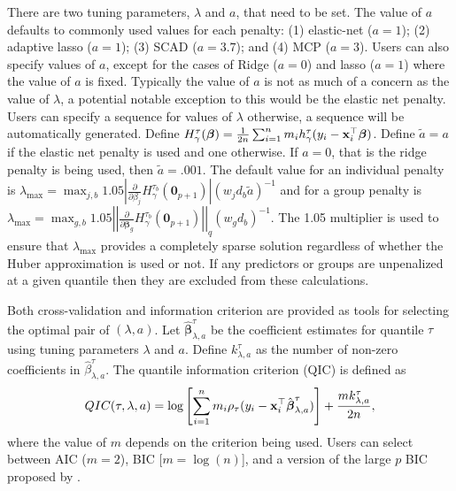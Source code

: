 There are two tuning parameters, \(\lambda\) and \(a\), that need to be set. The value of \(a\) defaults to commonly used values for each penalty: (1) elastic-net (\(a=1\)); (2) adaptive lasso (\(a=1\)); (3) SCAD (\(a=3.7\)); and (4) MCP (\(a=3\)). Users can also specify values of \(a\), except for the cases of Ridge (\(a=0\)) and lasso (\(a=1\)) where the value of \(a\) is fixed. Typically the value of \(a\) is not as much of a concern as the value of \(\lambda\), a potential notable exception to this would be the elastic net penalty. Users can specify a sequence for values of \(\lambda\) otherwise, a sequence will be automatically generated. Define \(H_\gamma^\tau(\boldsymbol \beta) = \frac{1}{2n} \sum_{i=1}^n m_i h_\gamma^\tau(y_i - {\bf x}_i^\top\boldsymbol \beta)\). Define \(\tilde{a}=a\) if the elastic net penalty is used and one otherwise. If \(a=0\), that is the ridge penalty is being used, then \(\tilde{a}=.001\). The default value for an individual penalty is \(\lambda_{\max} = \max_{j,b} 1.05\left|\frac{\partial}{\partial \beta_j} H_\gamma^{\tau_b}(\mathbf{0}_{p+1})\right|(w_jd_b\tilde{a})^{-1}\) and for a group penalty is \(\lambda_{\max} = \max_{g,b} 1.05\left|\left| \frac{\partial}{\partial \boldsymbol \beta_g} H_\gamma^{\tau_b}(\mathbf{0}_{p+1})\right|\right|_q (w_gd_b)^{-1}\). The 1.05 multiplier is used to ensure that \(\lambda_{\max}\) provides a completely sparse solution regardless of whether the Huber approximation is used or not. If any predictors or groups are unpenalized at a given quantile then they are excluded from these calculations.

Both cross-validation and information criterion are provided as tools for selecting the optimal pair of \((\lambda,a)\). Let \(\hat{\boldsymbol \beta}^\tau_{\lambda,a}\) be the coefficient estimates for quantile \(\tau\) using tuning parameters \(\lambda\) and \(a\). Define \(k^\tau_{\lambda,a}\) as the number of non-zero coefficients in \(\hat{\beta}_{\lambda,a}^\tau\). The quantile information criterion (QIC) is defined as
\begin{equation}
QIC(\tau,\lambda,a) = \log\left[ \sum_{i=1}^n m_i \rho_\tau(y_i-{\bf x}_i^\top \hat{\boldsymbol \beta}^\tau_{\lambda,a}) \right] + \frac{mk^\tau_{\lambda,a}}{2n},
\label{eq:qic}
\end{equation}
where the value of \(m\) depends on the criterion being used. Users can select between AIC (\(m=2\)), BIC {[}\(m=\log(n)\){]}, and a version of the large \(p\) BIC proposed by \citet[\(m=\log(n)\log(p)\)]{qrbic}.

